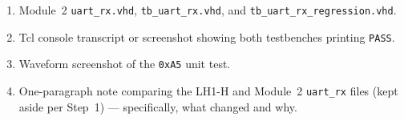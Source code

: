\documentclass[11pt,letterpaper]{article}
\begin{document}
\begin{tcolorbox}[deliverable={Lab Handout 2-B Deliverable}]
	\begin{enumerate}[leftmargin=1.2em]
		\item Module~2 \texttt{uart\_rx.vhd}, \texttt{tb\_uart\_rx.vhd}, and \texttt{tb\_uart\_rx\_regression.vhd}.
		\item Tcl console transcript or screenshot showing both testbenches printing \texttt{PASS}.
		\item Waveform screenshot of the \texttt{0xA5} unit test.
		\item One-paragraph note comparing the LH1-H and Module~2 \texttt{uart\_rx} files (kept aside per Step~1) --- specifically, what changed and why.
	\end{enumerate}
\end{tcolorbox}

\printhandoutglossary
\end{document}
